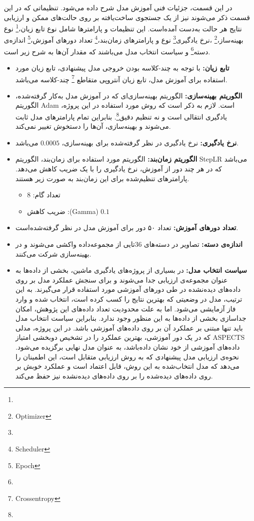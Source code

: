 

در این قسمت، جزئیات فنی آموزش مدل شرح داده می‌شود.
تنظیماتی که در این قسمت ذکر می‌شوند نیز از یک جستجوی ساخت‌یافته بر روی حالت‌های ممکن و ارزیابی نتایج هر حالت به‌دست آمده‌است.
این تنظیمات و پارامترها شامل 
نوع تابع زیان،\footnote{}
نوع بهینه‌ساز،\footnote{Optimizer}
،نرخ یادگیری\footnote{}
نوع و پارامتر‌های زمان‌بند،\footnote{Scheduler}
تعداد دور‌های آموزش،\footnote{Epoch}
اندازه‌ی دسته\footnote{}
و 
سیاست انتخاب مدل می‌باشند که مقدار آن‌ها به شرح زیر است.

\begin{itemize}
    \item \textbf{تابع زیان:} با توجه به چند-کلاسه بودن خروجی مدل پیشنهادی، تابع زیان مورد استفاده برای آموزش مدل، تابع زیان آنتروپی متقاطع
    \footnote{Crossentropy}
    چند-کلاسه می‌باشد.
    \item \textbf{الگوریتم بهینه‌سازی:} الگوریتم بهینه‌سازی‌ای که در آموزش مدل به‌کار گرفته‌شده، الگوریتم Adam است.
    لازم به ذکر است که روش مورد استفاده در این پروژه، یادگیری انتقالی است و نه تنظیم دقیق\footnote{}. بنابراین تمام پارامتر‌های مدل  ثابت می‌شوند و بهینه‌سازی، آن‌ها را دستخوش تغییر نمی‌کند.
    \item \textbf{نرخ یادگیری:} نرخ یادگیری در نظر گرفته‌شده برای بهینه‌سازی، $0.0005$ می‌باشد.
    \item \textbf{الگوریتم زمان‌بند:} الگوریتم مورد استفاده برای زمان‌بند، الگوریتم StepLR می‌باشد که در هر چند دور از آموزش، نرخ یادگیری را با یک ضریب کاهش می‌دهد. پارامتر‌های تنظیم‌شده برای این زمان‌بند به صورت زیر هستند.
    \begin{itemize}
        \item تعداد گام: 8
        \item ضریب کاهش :(Gamma) $0.1$
    \end{itemize}
    \item \textbf{تعداد دور‌های آموزش:} تعداد ۵۰ دور برای آموزش مدل در نظر گرفته‌شده‌است.
    \item \textbf{اندازه‌ی دسته:} تصاویر در دسته‌های 36تایی از مجموعه‌داده واکشی می‌شوند و در بهینه‌سازی شرکت می‌کنند.
    \item \textbf{سیاست انتخاب مدل:} در بسیاری از پروژه‌های یادگیری ماشین، بخشی از داده‌ها به عنوان مجموعه‌ی ارزیابی جدا می‌شوند و برای سنجش عملکرد مدل بر روی داده‌های دیده‌نشده در طی دور‌های آموزشی مورد استفاده قرار می‌گیرند.
    به این ترتیب، مدل در وضعیتی که بهترین نتایج را کسب کرده است، انتخاب شده و وارد فاز آزمایشی می‌شود.
    اما به علت محدودیت تعداد داده‌های این پژوهش، امکان جداسازی بخشی از داده‌ها به این منظور وجود ندارد.
    بنابراین سیاست انتخاب مدل باید تنها مبتنی بر عملکرد آن بر روی داده‌های آموزشی باشد.
    در این پروژه، مدلی که در یک دور آموزشی، بهترین عملکرد را در تشخیص دوبخشی امتیاز ASPECTS داده‌های آموزشی از خود نشان داده‌باشد، به عنوان مدل نهایی برگزیده می‌شود.
    نحوه‌ی ارزیابی مدل پیشنهادی که به روش ارزیابی متقابل است، این اطمینان را می‌دهد که مدل انتخاب‌شده به این روش، قابل اعتماد است و عملکرد خوبش بر روی داده‌های دیده‌شده را بر روی داده‌های دیده‌نشده نیز حفظ می‌کند.
\end{itemize}


